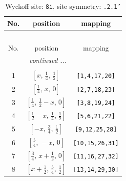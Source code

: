 \documentclass[fleqn,8pt]{jsarticle}
\begin{document}
\begin{longtable}{ccc}
\caption{Wyckoff site: {\tt 8i}, site symmetry: {\tt .2.1'}}
 \\
 \hline \hline
No. & position & mapping \\ \hline \endfirsthead

\multicolumn{2}{l}{\tablename\ \thetable{}} \\
 \hline \hline
No. & position & mapping \\ \hline \endhead

 \hline \hline
\multicolumn{2}{r}{\footnotesize\it continued ...} \\ \endfoot

 \hline \hline
\multicolumn{2}{r}{} \\ \endlastfoot

1 & $\left[ x,\, \frac{1}{4},\, \frac{1}{2} \right]$ & {\tt [1,4,17,20]} \\ \hline
2 & $\left[ \frac{1}{4},\, x,\, 0 \right]$ & {\tt [2,7,18,23]} \\ \hline
3 & $\left[ \frac{1}{4},\, \frac{1}{2} - x,\, 0 \right]$ & {\tt [3,8,19,24]} \\ \hline
4 & $\left[ \frac{1}{2} - x,\, \frac{1}{4},\, \frac{1}{2} \right]$ & {\tt [5,6,21,22]} \\ \hline
5 & $\left[ - x,\, \frac{3}{4},\, \frac{1}{2} \right]$ & {\tt [9,12,25,28]} \\ \hline
6 & $\left[ \frac{3}{4},\, - x,\, 0 \right]$ & {\tt [10,15,26,31]} \\ \hline
7 & $\left[ \frac{3}{4},\, x + \frac{1}{2},\, 0 \right]$ & {\tt [11,16,27,32]} \\ \hline
8 & $\left[ x + \frac{1}{2},\, \frac{3}{4},\, \frac{1}{2} \right]$ & {\tt [13,14,29,30]} \\
\end{longtable}
\renewcommand{\arraystretch}{1.2}
\end{document}
